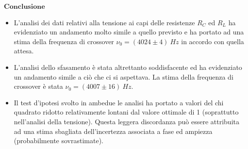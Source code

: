 \documentclass{beamer}
\begin{document}
\begin{frame}{$\mathbf{\ Conclusione}$}
    \begin{itemize}
        \item <1-> L'analisi dei dati relativi alla tensione ai capi delle resistenze $R_C$ ed $R_L$ ha evidenziato un andamento molto simile a quello previsto e ha portato 
        ad una stima della frequenza di crossover $\nu_0 = (4024 \pm 4) \ Hz$ in accordo con quella attesa.
        \item <2-> L'analisi dello sfasamento è stata altrettanto soddisfacente ed ha evidenziato un andamento simile a ciò che ci si aspettava. La stima della 
        frequenza di crossover è stata $\nu_0 = (4007 \pm 16) \ Hz$.
        \item <3-> Il test d'ipotesi svolto 
        in ambedue le analisi ha portato a valori del chi quadrato ridotto relativamente lontani dal valore ottimale di 1 (soprattutto nell'analisi della tensione). Questa leggera discordanza 
        può essere attribuita ad una stima sbagliata dell'incertezza associata a fase ed ampiezza (probabilmente sovrastimate).
    \end{itemize}
\end{frame}
\end{document}
